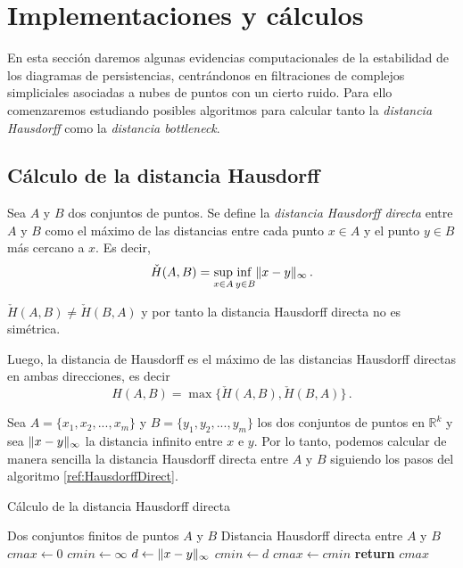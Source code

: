 \section{Implementaciones y cálculos}\label{sec:impl}
En esta sección daremos algunas evidencias computacionales de la estabilidad de los diagramas de persistencias, centrándonos en filtraciones de complejos simpliciales asociadas a nubes de puntos con un cierto ruido. Para ello comenzaremos estudiando posibles algoritmos para calcular tanto la \emph{distancia Hausdorff} como la \emph{distancia bottleneck}. 
\subsection{Cálculo de la distancia Hausdorff}

\begin{definition}
Sea $A$ y $B$ dos conjuntos de puntos. Se define la \emph{distancia Hausdorff directa} entre $A$ y $B$ como el máximo de las distancias entre cada punto $x \in A$ y el punto $y \in B$ más cercano a $x$. Es decir,
\[
\check{H}(A,B)= \adjustlimits\sup_{x \in A} \inf_{y \in B} \norm{x-y}_\infty\,.
\]
\end{definition}

\begin{remark}
$\check{H}(A,B) \neq \check{H}(B,A)$ y por tanto la distancia Hausdorff directa no es simétrica.
\end{remark}

Luego, la distancia de Hausdorff es el máximo de las distancias Hausdorff directas en ambas direcciones, es decir
\[
H(A,B) = \max\{\check{H}(A,B), \check{H}(B,A)\}\,.
\]

Sea $A=\{x_1, x_2, ...,x_m\}$ y $B=\{y_1, y_2, ...,y_m\}$ los dos conjuntos de puntos en $\mathbb{R}^k$ y sea $\lVert x-y\rVert_\infty$ la distancia infinito entre $x$ e $y$. Por lo tanto, podemos calcular de manera sencilla la distancia Hausdorff directa entre $A$ y $B$ siguiendo los pasos del algoritmo \ref{ref:HausdorffDirect}.

\begin{algorithm}[!ht]
\caption{Cálculo de la distancia Hausdorff directa}\label{ref:HausdorffDirect}
\begin{algorithmic}[1]
\Require Dos conjuntos finitos de puntos $A$ y $B$
\Ensure Distancia Hausdorff directa entre $A$ y $B$
\State $cmax\gets 0$
	\State $cmin\gets \infty$
		\State $d\gets \lVert x-y\rVert_\infty$
			\State $cmin\gets d$
		\EndIf
	\EndFor
		\State $cmax\gets cmin$
	\EndIf
\EndFor
\State \textbf{return} $cmax$
\end{algorithmic}
\end{algorithm}

